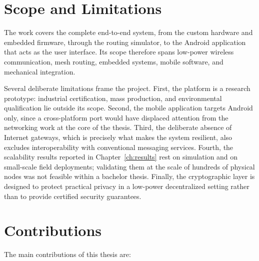 \documentclass[english,bachelor]{tfgitic}[2026/01/22]
\begin{document}
\section{Scope and Limitations}

The work covers the complete end-to-end system, from the custom hardware and embedded firmware, through the routing simulator, to the Android application that acts as the user interface. Its scope therefore spans low-power wireless communication, mesh routing, embedded systems, mobile software, and mechanical integration.

Several deliberate limitations frame the project. First, the platform is a research prototype: industrial certification, mass production, and environmental qualification lie outside its scope. Second, the mobile application targets Android only, since a cross-platform port would have displaced attention from the networking work at the core of the thesis. Third, the deliberate absence of Internet gateways, which is precisely what makes the system resilient, also excludes interoperability with conventional messaging services. Fourth, the scalability results reported in Chapter~\ref{ch:results} rest on simulation and on small-scale field deployments; validating them at the scale of hundreds of physical nodes was not feasible within a bachelor thesis. Finally, the cryptographic layer is designed to protect practical privacy in a low-power decentralized setting rather than to provide certified security guarantees.

\section{Contributions}

The main contributions of this thesis are:
\end{document}

